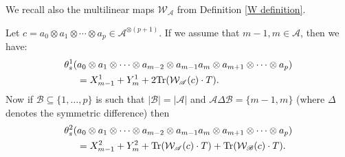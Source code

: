     We recall also the multilinear maps $\mathcal{W}_{\mathscr{A}}$ from Definition \ref{W definition}. 

    \begin{lem}\label{kogom app 4}
        Let $c=a_0\otimes a_1\otimes\cdots\otimes a_p \in \mathcal{A}^{\otimes (p+1)}$. If we assume that $m-1,m \in \mathscr{A}$, then we have:
        \begin{align*}
            \theta_s^1(&a_0\otimes a_1\otimes\cdots\otimes a_{m-2}\otimes a_{m-1}a_m\otimes a_{m+1}\otimes\cdots\otimes a_p)\\
                       &=X_{m-1}^1+Y_m^1+2{\rm Tr}(\mathcal{W}_{\mathscr{A}}(c)\cdot T).
        \end{align*}
        Now if $\mathscr{B} \subseteq \{1,\ldots, p\}$ is such that $|\mathscr{B}|=|\mathscr{A}|$ and $\mathscr{A}\Delta \mathscr{B} = \{m-1,m\}$ (where $\Delta$ denotes the symmetric difference) then
        \begin{align*}
            \theta_s^2(&a_0\otimes a_1\otimes\cdots\otimes a_{m-2}\otimes a_{m-1}a_m\otimes a_{m+1}\otimes\cdots\otimes a_p)\\
                       &= X_{m-1}^2+Y_m^2+{\rm Tr}(\mathcal{W}_{\mathscr{A}}(c)\cdot T)+{\rm Tr}(\mathcal{W}_{\mathscr{B}}(c)\cdot T).
        \end{align*}
    \end{lem}
